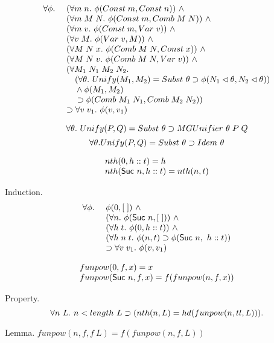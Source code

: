 \begin{slide}

\[
\begin{array}{rl}
\forall \phi.\ & (\forall m\;n.\ \phi  (Const\;m, Const\;n))  \ \land \\
& (\forall m\;M\;N.\ \phi  (Const\;m, Comb\;M\;N))  \ \land \\
& (\forall m\;v.\ \phi  (Const\;m, Var\;v)) \ \land \\
& (\forall v\;M.\ \phi  (Var\;v, M)) \ \land \\
& (\forall M\;N\;x.\ \phi  (Comb\;M\;N, Const\;x)) \ \land \\
& (\forall M\;N\;v.\ \phi  (Comb\;M\;N, Var\;v)) \ \land \\
& (\forall M_1\;N_1\;M_2\;N_2. \\
& {~~~}(\forall  \theta.\ Unify (M_1, M_2) = Subst\ \theta  \imp \phi
(N_1 \lhd  \theta, N_2 \lhd \theta)) \\ 
& {~~~}\land\phi  (M_1, M_2)  \\
& {~~~}\imp\phi  (Comb\;M_1\;N_1, Comb\;M_2\;N_2)) \\
&  \imp \forall v\;v_1.\ \phi (v, v_1)
\end{array}
\]
\end{slide}

\begin{slide}
\[\forall \theta.\ Unify(P,Q) = Subst\  \theta  \supset MGUnifier\ \theta\;P\;Q \]
\[ \forall \theta. Unify (P,Q) = Subst\  \theta  \supset Idem\ \theta \]
\end{slide}

\begin{slide}
\[\begin{array}{l}
nth(0, h::t) = h \\
nth(\mbox{\sf {Suc}}\ n, h::t) = nth(n,t)
\end{array}\]

\noindent Induction.
\[
\begin{array}{rl}
\forall \phi.\ & \phi (0,[\;])\ \land \\
& (\forall n.\ \phi  (\mbox{\sf {Suc}}\ n,[\;]))  \ \land \\
& (\forall h\;t.\ \phi  (0,h :: t)) \ \land \\
& (\forall h\;n\;t.\ \phi(n,t) \supset \phi (\mbox{\sf {Suc}}\ n,\ h::t)) \\
&  \supset \forall v\;v_1.\ \phi (v, v_1)
\end{array}
\]
\end{slide}
\begin{slide}
\[\begin{array}{l}
funpow(0, f, x) = x \\
funpow(\mbox{\sf {Suc}}\ n, f, x) = f(funpow(n,f,x))
\end{array}\]

\noindent Property.
\[\forall n\ L.\ n < length\ L \imp (nth(n,L) = hd(funpow(n,tl,L))). \]

\noindent Lemma. $funpow (n, f, f\ L) = f (funpow (n, f, L))$ 

\end{slide}

